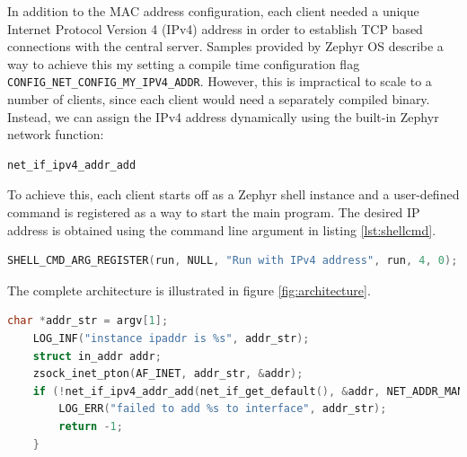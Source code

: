 \documentclass[12pt]{article}
\begin{document}
In addition to the MAC address configuration, each client needed a unique Internet Protocol Version
4 (IPv4) address in order to establish TCP based connections with the central server. Samples
provided by Zephyr OS describe a way to achieve this my setting a compile time configuration flag
\verb|CONFIG_NET_CONFIG_MY_IPV4_ADDR|. However, this is impractical to scale to a number of clients, since
each client would need a separately compiled binary. Instead, we can assign the IPv4 address
dynamically using the built-in Zephyr network function:
\begin{verbatim}
net_if_ipv4_addr_add
\end{verbatim}
To achieve this, each client starts off as a Zephyr shell instance and a user-defined command is registered as a way to start the main program.
The desired IP address is obtained using the command line argument in listing \ref{lst:shellcmd}.

\begin{lstlisting}[language=C, caption=Registering user defined command "run" to the function
pointer run,label={lst:shellcmd}]
SHELL_CMD_ARG_REGISTER(run, NULL, "Run with IPv4 address", run, 4, 0);
\end{lstlisting}

The complete architecture is illustrated in figure \ref{fig:architecture}.

\begin{lstlisting}[language=C, caption=the "run" function which performs IP address assignment at runtime]
    char *addr_str = argv[1];
    LOG_INF("instance ipaddr is %s", addr_str);
    struct in_addr addr;
    zsock_inet_pton(AF_INET, addr_str, &addr);
    if (!net_if_ipv4_addr_add(net_if_get_default(), &addr, NET_ADDR_MANUAL, UINT32_MAX)) {
        LOG_ERR("failed to add %s to interface", addr_str);
        return -1;
    }
\end{lstlisting}
\end{document}
